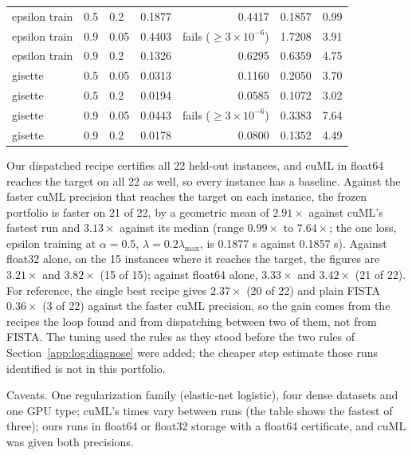\begin{center}
\begin{tabular}{lllrrrr}
epsilon train & 0.5 & 0.2 & 0.1877 & 0.4417 & 0.1857 & 0.99 \\
epsilon train & 0.9 & 0.05 & 0.4403 & fails ($\ge3\times10^{-6}$) & 1.7208 & 3.91 \\
epsilon train & 0.9 & 0.2 & 0.1326 & 0.6295 & 0.6359 & 4.75 \\
gisette & 0.5 & 0.05 & 0.0313 & 0.1160 & 0.2050 & 3.70 \\
gisette & 0.5 & 0.2 & 0.0194 & 0.0585 & 0.1072 & 3.02 \\
gisette & 0.9 & 0.05 & 0.0443 & fails ($\ge3\times10^{-6}$) & 0.3383 & 7.64 \\
gisette & 0.9 & 0.2 & 0.0178 & 0.0800 & 0.1352 & 4.49 \\
\bottomrule
\end{tabular}
\end{center}

Our dispatched recipe certifies all 22 held-out instances, and cuML in float64
reaches the target on all 22 as well, so every instance has a baseline. Against
the faster cuML precision that reaches the target on each instance, the frozen
portfolio is faster on 21 of 22, by a geometric mean of $2.91\times$ against cuML's
fastest run and $3.13\times$ against its median (range $0.99\times$ to $7.64\times$;
the one loss, epsilon training at $\alpha=0.5$, $\lambda=0.2\lambda_{\max}$, is 0.1877 s
against 0.1857 s). Against float32 alone, on the 15 instances where it reaches the
target, the figures are $3.21\times$ and $3.82\times$ (15 of 15); against float64 alone,
$3.33\times$ and $3.42\times$ (21 of 22). For reference, the single best recipe gives
$2.37\times$ (20 of 22) and plain FISTA $0.36\times$ (3 of 22) against the faster cuML
precision, so the gain comes from the recipes the loop found and from dispatching
between two of them, not from FISTA. The tuning used the rules as they stood before
the two rules of Section~\ref{app:log:diagnose} were added; the cheaper step estimate
those runs identified is not in this portfolio.

Caveats. One regularization family (elastic-net logistic), four dense datasets and
one GPU type; cuML's times vary between runs (the table shows the fastest of three);
ours runs in float64 or float32 storage with a float64
certificate, and cuML was given both precisions.

